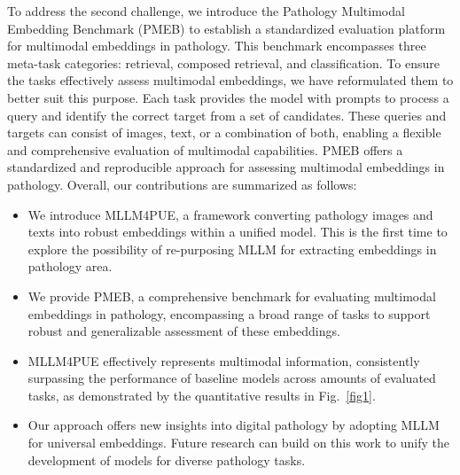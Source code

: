 To address the second challenge, we introduce the Pathology Multimodal Embedding Benchmark (PMEB) to establish a standardized evaluation platform for multimodal embeddings in pathology. This benchmark encompasses three meta-task categories: retrieval, composed retrieval, and classification. To ensure the tasks effectively assess multimodal embeddings, we have reformulated them to better suit this purpose. Each task provides the model with prompts to process a query and identify the correct target from a set of candidates. These queries and targets can consist of images, text, or a combination of both, enabling a flexible and comprehensive evaluation of multimodal capabilities. PMEB offers a standardized and reproducible approach for assessing multimodal embeddings in pathology. Overall, our contributions are summarized as follows:
\begin{itemize}
\item We introduce MLLM4PUE, a framework converting pathology images and texts into robust embeddings within a unified model. This is the first time to explore the possibility of re-purposing MLLM for extracting embeddings in pathology area.

\item We provide PMEB, a comprehensive benchmark for evaluating multimodal embeddings in pathology, encompassing a broad range of tasks to support robust and generalizable assessment of these embeddings.

\item MLLM4PUE effectively represents multimodal information, consistently surpassing the performance of baseline models across amounts of evaluated tasks, as demonstrated by the quantitative results in Fig.~\ref{fig1}.

\item Our approach offers new insights into digital pathology by adopting MLLM for universal embeddings. Future research can build on this work to unify the development of models for diverse pathology tasks.
\end{itemize}

